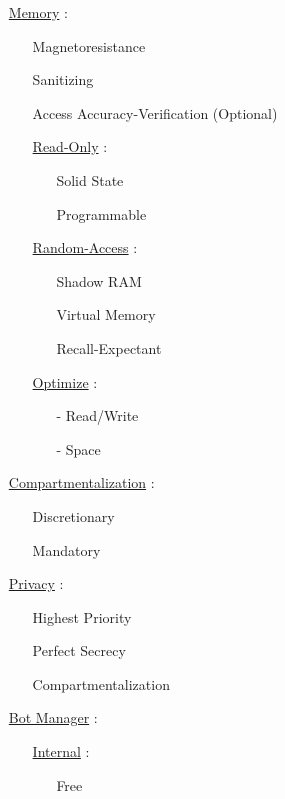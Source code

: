 \documentclass[11pt]{article}
\begin{document}
\begin{enumerate}
	\item[] \ul{Memory} :
	\begin{enumerate}
		\item[] Magnetoresistance
		\item[] Sanitizing
		\item[] Access Accuracy-Verification (Optional)
		
		\item[] \ul{Read-Only} :
		\begin{enumerate}
			\item[] Solid State
			\item[] Programmable
		\end{enumerate}
	
		\item[] \ul{Random-Access} :
		\begin{enumerate}
			\item[] Shadow RAM
			\item[] Virtual Memory
			\item[] Recall-Expectant
		\end{enumerate}
		
		\item[] \ul{Optimize}  :
		\begin{enumerate}
			\item[-] Read/Write
			\item[-] Space
		\end{enumerate}
	\end{enumerate}

	\item[] \ul{Compartmentalization} :
	\begin{enumerate}
		\item[] Discretionary
		\item[] Mandatory
	\end{enumerate}

	\item[] \ul{Privacy} :
	\begin{enumerate}
		\item[] Highest Priority
		\item[] Perfect Secrecy
		\item[] Compartmentalization
	\end{enumerate}
	
	\item[] \ul{Bot Manager} :
	\begin{enumerate}
		\item[] \ul{Internal}  :
		\begin{enumerate}
			\item[] Free
		\end{enumerate}
	

\end{enumerate}
\end{enumerate}
\end{document}
